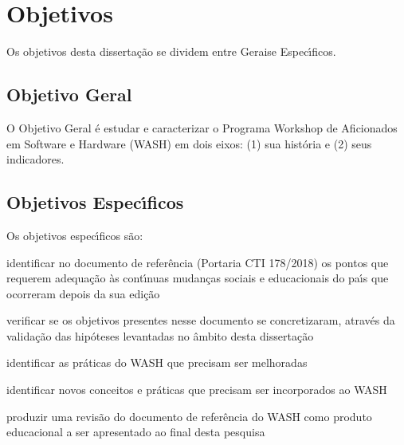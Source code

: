 \documentclass[
12pt,		%
openright,	%
twoside,  %
a4paper,			%
chapter=TITLE,		%
english,			%
french,				%
spanish,			%
brazil				%
]{USPSC-classe/USPSC}
\begin{document}
\section[Objetivos]{Objetivos}\label{Objetivos}
Os objetivos desta disserta\c{c}\~ao se dividem entre \textquotedbl Gerais\textquotedbl  e \textquotedbl Espec\'{\i}ficos\textquotedbl .

















\subsection[Objetivo Geral]{Objetivo Geral}\label{Objetivo Geral}
O Objetivo Geral \'e estudar e caracterizar o Programa Workshop de Aficionados em Software e Hardware (WASH) em dois eixos: (1) sua hist\'oria e (2) seus indicadores.

















\subsection[Objetivos Espec\'{\i}ficos]{Objetivos Espec\'{\i}ficos}\label{Objetivos Espec\'{\i}ficos}
Os objetivos espec\'{\i}ficos s\~ao:


















\begin{alineas}
\item identificar no documento de refer\^encia (Portaria CTI 178/2018) os pontos que requerem adequa\c{c}\~ao \`as cont\'{\i}nuas mudan\c{c}as sociais e educacionais do pa\'{\i}s que ocorreram depois da sua edi\c{c}\~ao
\item verificar se os objetivos presentes nesse documento se concretizaram, atrav\'es da valida\c{c}\~ao das hip\'oteses levantadas no \^ambito desta disserta\c{c}\~ao
\item identificar as pr\'aticas do WASH que precisam ser melhoradas
\item identificar novos conceitos e pr\'aticas que precisam ser incorporados ao WASH
\item produzir uma revis\~ao do documento de refer\^encia do WASH como produto educacional a ser apresentado ao final desta pesquisa
\end{alineas}
\end{document}
